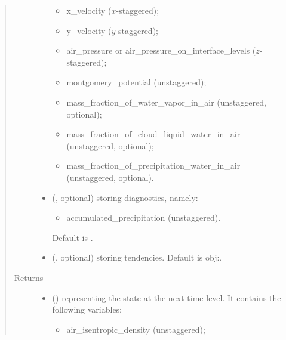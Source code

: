 \documentclass[letterpaper,10pt,english]{sphinxmanual}
\begin{document}
\begin{fulllineitems}
\begin{fulllineitems}
\begin{quote}
\begin{description}
\begin{itemize}
\begin{itemize}
\item {} 
x\_velocity (\(x\)-staggered);

\item {} 
y\_velocity (\(y\)-staggered);

\item {} 
air\_pressure or air\_pressure\_on\_interface\_levels (\(z\)-staggered);

\item {} 
montgomery\_potential (unstaggered);

\item {} 
mass\_fraction\_of\_water\_vapor\_in\_air (unstaggered, optional);

\item {} 
mass\_fraction\_of\_cloud\_liquid\_water\_in\_air (unstaggered, optional);

\item {} 
mass\_fraction\_of\_precipitation\_water\_in\_air (unstaggered, optional).

\end{itemize}


\item {} 
 (, optional) \textendash{} 
{\hyperref[\detokenize{api:tasmania.storages.grid_data.GridData}]{}} storing diagnostics, namely:
\begin{itemize}
\item {} 
accumulated\_precipitation (unstaggered).

\end{itemize}

Default is .


\item {} 
 (, optional) \textendash{} {\hyperref[\detokenize{api:tasmania.storages.grid_data.GridData}]{}} storing tendencies. Default is obj:.

\end{itemize}

\item[{Returns}] \leavevmode
\begin{itemize}
\item {} 
 () \textendash{} {\hyperref[\detokenize{api:tasmania.storages.state_isentropic.StateIsentropic}]{}} representing the state at the next time level.
It contains the following variables:
\begin{itemize}
\item {} 
air\_isentropic\_density (unstaggered);


\end{itemize}
\end{itemize}
\end{description}
\end{quote}
\end{fulllineitems}
\end{fulllineitems}
\end{document}
